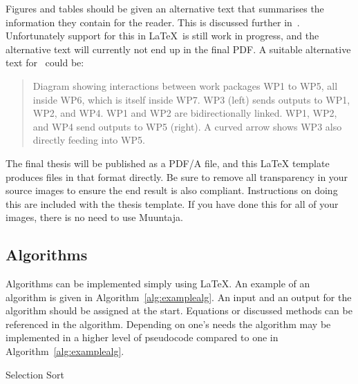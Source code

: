 Figures and tables should be given an alternative text that summarises
the information they contain for the reader. This is discussed further
in~. Unfortunately support for this in
\LaTeX\ is still work in progress, and the alternative text will
currently not end up in the final PDF. A suitable alternative text
for~ could be:

\begin{quote}
Diagram showing interactions between work packages WP1 to WP5, all
inside WP6, which is itself inside WP7. WP3 (left) sends outputs to
WP1, WP2, and WP4. WP1 and WP2 are bidirectionally linked. WP1,
WP2, and WP4 send outputs to WP5 (right). A curved arrow shows WP3
also directly feeding into WP5.
\end{quote}

The final thesis will be published as a PDF/A file, and this LaTeX
template produces files in that format directly. Be sure to remove all 
transparency in your source images to ensure the end result is also 
compliant. Instructions on doing this are included with the thesis template.
If you have done this for all of your images, there is no need to use
Muuntaja.

\subsection{Algorithms}
Algorithms can be implemented simply using \LaTeX. An example of an
algorithm is given in Algorithm~\ref{alg:examplealg}. An input and an
output for the algorithm should be assigned at the start. Equations
or discussed methods can be referenced in the algorithm. Depending on
one's needs the algorithm may be implemented in a higher level of
pseudocode compared to one in Algorithm~\ref{alg:examplealg}.

\vspace{7mm}
\begin{algorithm}[H]
\SetAlgoLined
\DontPrintSemicolon
{}
\caption{Selection Sort}
\label{alg:examplealg}
\end{algorithm}

